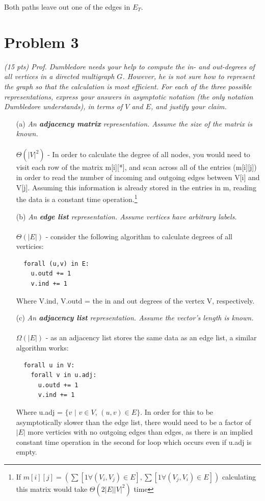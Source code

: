 \documentclass[12pt]{article} \setlength{\oddsidemargin}{0in}
\begin{document}
  Both paths leave out one of the edges in $E_T$. 

\newpage

\section*{Problem 3}

\textit{(15 pts) Prof. Dumbledore needs your help to compute the in-
  and out-degrees of all vertices in a directed multigraph
  $G$. However, he is not sure how to represent the graph so that the
  calculation is most efficient. For each of the three possible
  representations, express your answers in asymptotic notation (the
  only notation Dumbledore understands), in terms of $V$ and $E$, and
  justify your claim.}

\begin{enumerate}
\item[(a)]{\textit{An \textbf{adjacency matrix} representation. Assume
      the size of the matrix is known.}}\\\\
  $\Theta(|V|^2)$ - In order to calculate the degree of all nodes, you would need to visit each row of the matrix m[i][*], and scan across all of the entries (m[i][j]) in order to read the number of incoming and outgoing edges between V[i] and V[j]. Assuming this information is already stored in the entries in m, reading the data is a constant time operation.\footnote{If $m[i][j] = (\sum{[1 \forall (V_i,V_j) \in E]} , \sum{[1 \forall (V_j,V_i) \in E]})$ calculating this matrix would take $\Theta(2|E||V|^2)$ time}
  \\
\item[(b)]{\textit{An \textbf{edge list} representation. Assume
      vertices have arbitrary labels.}}
  \\\\
  $\Theta(|E|)$ - consider the following algorithm to calculate degrees of all verticies:
  \begin{verbatim}
  forall (u,v) in E:
    u.outd += 1
    v.ind += 1 
  \end{verbatim}
  Where V.ind, V.outd = the in and out degrees of the vertex V, respectively. 
\item[(c)]{\textit{An \textbf{adjacency list} representation. Assume
      the vector’s length is known.}}
  \\\\
  $\Omega(|E|)$ - as an adjacency list stores the same data as an edge list, a similar algorithm works:
  \begin{verbatim}
  forall u in V:
    forall v in u.adj:
      u.outd += 1
      v.ind += 1
  \end{verbatim}
  Where u.adj = $\{v$ $|$ $v \in V$, $(u,v) \in E\}$. In order for this to be asymptotically slower than the edge list, there would need to be a factor of $|E|$ more verticies with no outgoing edges than edges, as there is an implied constant time operation in the second for loop which occurs even if u.adj is empty. 
\end{enumerate}
\end{document}

